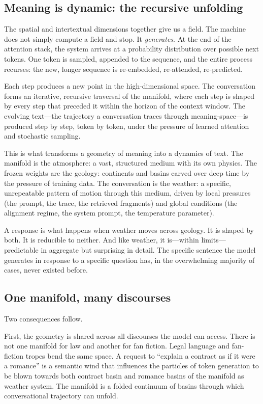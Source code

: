 \subsection{Meaning is dynamic: the recursive unfolding}

The spatial and intertextual dimensions together give us a field. The machine does not simply compute a field and stop. It \emph{generates}. At the end of the attention stack, the system arrives at a probability distribution over possible next tokens. One token is sampled, appended to the sequence, and the entire process recurses: the new, longer sequence is re-embedded, re-attended, re-predicted.

Each step produces a new point in the high-dimensional space. The conversation forms an iterative, recursive traversal of the manifold, where each step is shaped by every step that preceded it within the horizon of the context window. The evolving text---the trajectory a conversation traces through meaning-space---is produced step by step, token by token, under the pressure of learned attention and stochastic sampling.

This is what transforms a geometry of meaning into a dynamics of text. The manifold is the atmosphere: a vast, structured medium with its own physics. The frozen weights are the geology: continents and basins carved over deep time by the pressure of training data. The conversation is the weather: a specific, unrepeatable pattern of motion through this medium, driven by local pressures (the prompt, the trace, the retrieved fragments) and global conditions (the alignment regime, the system prompt, the temperature parameter).

A response is what happens when weather moves across geology. It is shaped by both. It is reducible to neither. And like weather, it is---within limits---predictable in aggregate but surprising in detail. The specific sentence the model generates in response to a specific question has, in the overwhelming majority of cases, never existed before.

\subsection{One manifold, many discourses}

Two consequences follow.

First, the geometry is shared across all discourses the model can access. There is not one manifold for law and another for fan fiction. Legal language and fan-fiction tropes bend the same space. A request to ``explain a contract as if it were a romance'' is a semantic wind that influences the particles of token generation to be blown towards both contract basin and romance basins of the manifold as weather system. The manifold is a folded continuum of basins through which conversational trajectory can unfold.

